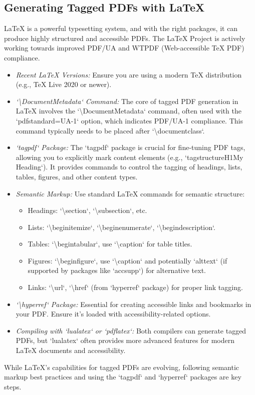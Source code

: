 \subsection{Generating Tagged PDFs with LaTeX}
\label{subsec:tagged-pdfs-latex}
LaTeX is a powerful typesetting system, and with the right packages, it can produce highly structured and accessible PDFs. The LaTeX Project is actively working towards improved PDF/UA and WTPDF (Web-accessible TeX PDF) compliance.\cite{LaTeXTaggedPDF}
\begin{itemize}
\item \emph{Recent LaTeX Versions:} Ensure you are using a modern TeX distribution (e.g., TeX Live 2020 or newer).
\item \emph{`\textbackslash{}DocumentMetadata` Command:} The core of tagged PDF generation in LaTeX involves the `\textbackslash{}DocumentMetadata` command, often used with the `pdfstandard=UA-1` option, which indicates PDF/UA-1 compliance. This command typically needs to be placed after `\textbackslash{}documentclass`.\cite{LaTeXAccessBlog}
\item \emph{`tagpdf` Package:} The `tagpdf` package is crucial for fine-tuning PDF tags, allowing you to explicitly mark content elements (e.g., `tagstructure{H1}{My Heading}`). It provides commands to control the tagging of headings, lists, tables, figures, and other content types.
\item \emph{Semantic Markup:} Use standard LaTeX commands for semantic structure:
\begin{itemize}
\item Headings: `\textbackslash{}section`, `\textbackslash{}subsection`, etc.
\item Lists: `\textbackslash{}begin{itemize}`, `\textbackslash{}begin{enumerate}`, `\textbackslash{}begin{description}`.
\item Tables: `\textbackslash{}begin{tabular}`, use `\textbackslash{}caption` for table titles.
\item Figures: `\textbackslash{}begin{figure}`, use `\textbackslash{}caption` and potentially `alttext` (if supported by packages like `accsupp`) for alternative text.
\item Links: `\textbackslash{}url`, `\textbackslash{}href` (from `hyperref` package) for proper link tagging.
\end{itemize}
\item \emph{`\textbackslash{}hyperref` Package:} Essential for creating accessible links and bookmarks in your PDF. Ensure it's loaded with accessibility-related options.
\item \emph{Compiling with `lualatex` or `pdflatex`:} Both compilers can generate tagged PDFs, but `lualatex` often provides more advanced features for modern LaTeX documents and accessibility.
\end{itemize}
While LaTeX's capabilities for tagged PDFs are evolving, following semantic markup best practices and using the `tagpdf` and `hyperref` packages are key steps.

